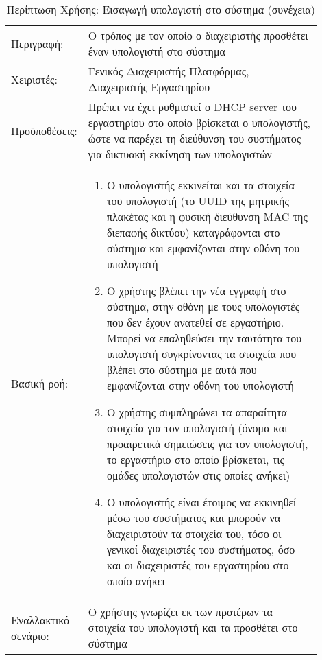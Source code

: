 %
%
\begin{longtable}{|p{0.14\linewidth}|p{0.76\linewidth}|}
	\caption{Περίπτωση Χρήσης: Εισαγωγή υπολογιστή στο σύστημα} \label{tab:use-case-add-computer} \\ \hline \endfirsthead
	\caption[{}]{Περίπτωση Χρήσης: Εισαγωγή υπολογιστή στο σύστημα (συνέχεια)} \\ \endhead \endfoot
	Περιγραφή: & Ο τρόπος με τον οποίο ο διαχειριστής προσθέτει έναν υπολογιστή στο σύστημα \\ \hline
	Χειριστές: & Γενικός Διαχειριστής Πλατφόρμας, Διαχειριστής Εργαστηρίου \\ \hline
	Προϋποθέσεις: & Πρέπει να έχει ρυθμιστεί ο DHCP server του εργαστηρίου στο οποίο βρίσκεται ο υπολογιστής, ώστε να παρέχει τη διεύθυνση του συστήματος για δικτυακή εκκίνηση των υπολογιστών \\ \hline
	Βασική ροή: &
	\begin{enumerate}
		\vspace{-1cm}
		\addtolength{\itemindent}{-0.4cm}
		\item Ο υπολογιστής εκκινείται και τα στοιχεία του υπολογιστή (το UUID της μητρικής πλακέτας και η φυσική διεύθυνση MAC της διεπαφής δικτύου) καταγράφονται στο σύστημα και εμφανίζονται στην οθόνη του υπολογιστή
		\item Ο χρήστης βλέπει την νέα εγγραφή στο σύστημα, στην οθόνη με τους υπολογιστές που δεν έχουν ανατεθεί σε εργαστήριο. Μπορεί να επαληθεύσει την ταυτότητα του υπολογιστή συγκρίνοντας τα στοιχεία που βλέπει στο σύστημα με αυτά που εμφανίζονται στην οθόνη του υπολογιστή
		\item Ο χρήστης συμπληρώνει τα απαραίτητα στοιχεία για τον υπολογιστή (όνομα και προαιρετικά σημειώσεις για τον υπολογιστή, το εργαστήριο στο οποίο βρίσκεται, τις ομάδες υπολογιστών στις οποίες ανήκει)
		\item Ο υπολογιστής είναι έτοιμος να εκκινηθεί μέσω του συστήματος και μπορούν να διαχειριστούν τα στοιχεία του, τόσο οι γενικοί διαχειριστές του συστήματος, όσο και οι διαχειριστές του εργαστηρίου στο οποίο ανήκει
		\vspace{-0.7cm}
	\end{enumerate} \\ \hline
	Εναλλακτικό σενάριο: & Ο χρήστης γνωρίζει εκ των προτέρων τα στοιχεία του υπολογιστή και τα προσθέτει στο σύστημα \\ \hline
\end{longtable}

